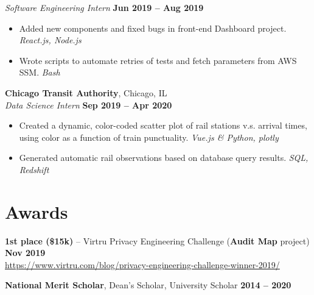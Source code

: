 \documentclass[margin]{resume}
\begin{document}
    \textsl{Software Engineering Intern} \hfill \textbf{Jun 2019 -- Aug 2019}

\begin{itemize}
\item Added new components and fixed bugs in front-end Dashboard project. \hfill \textit{React.js, Node.js}
\item Wrote scripts to automate retries of tests and fetch parameters from AWS SSM. \hfill \textit{Bash}
\end{itemize}


    \textcolor{blu}{\textbf{Chicago Transit Authority}}, Chicago, IL \vspace{2mm}\\\vspace{1mm}%
    \textsl{Data Science Intern} \hfill \textbf{Sep 2019 -- Apr 2020}

    \begin{itemize}
\item Created a dynamic, color-coded scatter plot of rail stations v.s. arrival times, \\using color as a function of train punctuality. \hfill \textit{Vue.js \& Python, plotly}


\item Generated automatic rail observations based on database query results. \hfill \textit{SQL, Redshift}

    \end{itemize}



    \section{\mysidestyle Awards}
    \textcolor{blu}{\textbf{1st place (\$15k)}} -- Virtru Privacy Engineering Challenge (\textbf {Audit Map} project) \hfill \textbf{Nov 2019} \\ \url{https://www.virtru.com/blog/privacy-engineering-challenge-winner-2019/}

\textbf{National Merit Scholar}, Dean’s Scholar, University Scholar \hfill \textbf{2014 -- 2020} %
\end{document}

